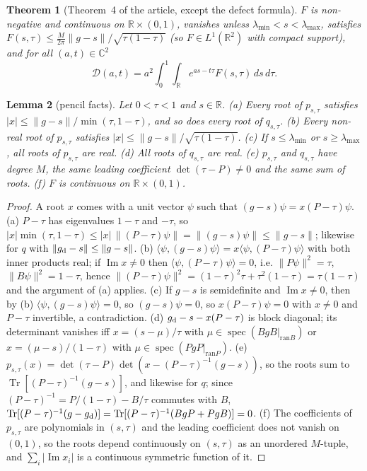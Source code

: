 \documentclass[11pt]{amsart}
\newtheorem{theorem}{Theorem}[section]
\newtheorem{lemma}[theorem]{Lemma}
\theoremstyle{definition}
\theoremstyle{remark}
\numberwithin{equation}{section}
\newcommand{\R}{\mathbb{R}}
\newcommand{\C}{\mathbb{C}}
\newcommand{\Tr}{\operatorname{Tr}}
\newcommand{\spec}{\operatorname{spec}}
\newcommand{\cD}{\mathcal{D}}
\renewcommand{\Im}{\operatorname{Im}}
\begin{document}
\begin{theorem}[Theorem~4 of the article, except the defect formula]\label{thm:bmv}
$F$ is non-negative and continuous on $\R\times(0,1)$, vanishes unless $\lambda_{\min}<s<\lambda_{\max}$, satisfies
$F(s,\tau)\le\frac{M}{2\pi}\|g-s\|/\sqrt{\tau(1-\tau)}$ (so $F\in L^1(\R^2)$ with compact support), and for all
$(a,t)\in\C^2$
\begin{equation}\label{eq:bmv}
\cD(a,t)=a^2\int_0^1\!\!\int_\R e^{as-t\tau}F(s,\tau)\,ds\,d\tau .
\end{equation}
\end{theorem}

\begin{lemma}[pencil facts]\label{lem:pencil}
Let $0<\tau<1$ and $s\in\R$.
(a) Every root of $p_{s,\tau}$ satisfies $|x|\le\|g-s\|/\min(\tau,1-\tau)$, and so does every root of $q_{s,\tau}$.
(b) Every non-real root of $p_{s,\tau}$ satisfies $|x|\le\|g-s\|/\sqrt{\tau(1-\tau)}$.
(c) If $s\le\lambda_{\min}$ or $s\ge\lambda_{\max}$, all roots of $p_{s,\tau}$ are real.
(d) All roots of $q_{s,\tau}$ are real.
(e) $p_{s,\tau}$ and $q_{s,\tau}$ have degree $M$, the same leading coefficient $\det(\tau-P)\ne0$ and the same sum of
roots.
(f) $F$ is continuous on $\R\times(0,1)$.
\end{lemma}

\begin{proof}
A root $x$ comes with a unit vector $\psi$ such that $(g-s)\psi=x(P-\tau)\psi$. (a) $P-\tau$ has eigenvalues $1-\tau$
and $-\tau$, so $|x|\min(\tau,1-\tau)\le|x|\,\|(P-\tau)\psi\|=\|(g-s)\psi\|\le\|g-s\|$; likewise for $q$ with
$\|g_{\rm d}-s\|\le\|g-s\|$. (b) $\langle\psi,(g-s)\psi\rangle=x\langle\psi,(P-\tau)\psi\rangle$ with both inner products
real; if $\Im x\ne0$ then $\langle\psi,(P-\tau)\psi\rangle=0$, i.e. $\|P\psi\|^2=\tau$, $\|B\psi\|^2=1-\tau$, hence
$\|(P-\tau)\psi\|^2=(1-\tau)^2\tau+\tau^2(1-\tau)=\tau(1-\tau)$ and the argument of (a) applies. (c) If $g-s$ is
semidefinite and $\Im x\ne0$, then by (b) $\langle\psi,(g-s)\psi\rangle=0$, so $(g-s)\psi=0$, so $x(P-\tau)\psi=0$ with
$x\ne0$ and $P-\tau$ invertible, a contradiction. (d) $g_{\rm d}-s-x(P-\tau)$ is block diagonal; its determinant
vanishes iff $x=(s-\mu)/\tau$ with $\mu\in\spec(BgB|_{\mathrm{ran}B})$ or $x=(\mu-s)/(1-\tau)$ with
$\mu\in\spec(PgP|_{\mathrm{ran}P})$. (e) $p_{s,\tau}(x)=\det(\tau-P)\det(x-(P-\tau)^{-1}(g-s))$, so the roots sum to
$\Tr[(P-\tau)^{-1}(g-s)]$, and likewise for $q$; since $(P-\tau)^{-1}=P/(1-\tau)-B/\tau$ commutes with $B$,
$\Tr[(P-\tau)^{-1}(g-g_{\rm d})]=\Tr[(P-\tau)^{-1}(BgP+PgB)]=0$. (f) The coefficients of $p_{s,\tau}$ are polynomials in
$(s,\tau)$ and the leading coefficient does not vanish on $(0,1)$, so the roots depend continuously on $(s,\tau)$ as an
unordered $M$-tuple, and $\sum_i|\Im x_i|$ is a continuous symmetric function of it.
\end{proof}
\end{document}
